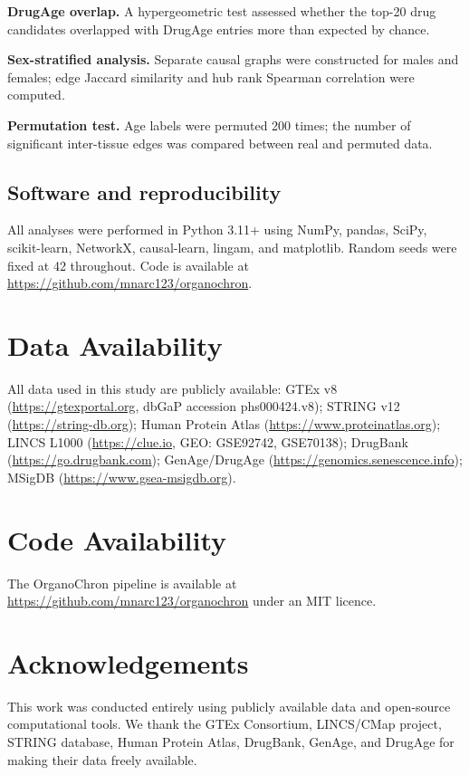 \documentclass[11pt,a4paper]{article}
\begin{document}
\textbf{DrugAge overlap.} A hypergeometric test assessed whether the top-20 drug candidates overlapped with DrugAge entries more than expected by chance.

\textbf{Sex-stratified analysis.} Separate causal graphs were constructed for males and females; edge Jaccard similarity and hub rank Spearman correlation were computed.

\textbf{Permutation test.} Age labels were permuted 200 times; the number of significant inter-tissue edges was compared between real and permuted data.

\subsection*{Software and reproducibility}

All analyses were performed in Python 3.11+ using NumPy, pandas, SciPy, scikit-learn, NetworkX, causal-learn, lingam, and matplotlib. Random seeds were fixed at 42 throughout. Code is available at \url{https://github.com/mnarc123/organochron}.

\section*{Data Availability}

All data used in this study are publicly available: GTEx v8 (\url{https://gtexportal.org}, dbGaP accession phs000424.v8); STRING v12 (\url{https://string-db.org}); Human Protein Atlas (\url{https://www.proteinatlas.org}); LINCS L1000 (\url{https://clue.io}, GEO: GSE92742, GSE70138); DrugBank (\url{https://go.drugbank.com}); GenAge/DrugAge (\url{https://genomics.senescence.info}); MSigDB (\url{https://www.gsea-msigdb.org}).

\section*{Code Availability}

The OrganoChron pipeline is available at \url{https://github.com/mnarc123/organochron} under an MIT licence.

\section*{Acknowledgements}

This work was conducted entirely using publicly available data and open-source computational tools. We thank the GTEx Consortium, LINCS/CMap project, STRING database, Human Protein Atlas, DrugBank, GenAge, and DrugAge for making their data freely available.
\end{document}
